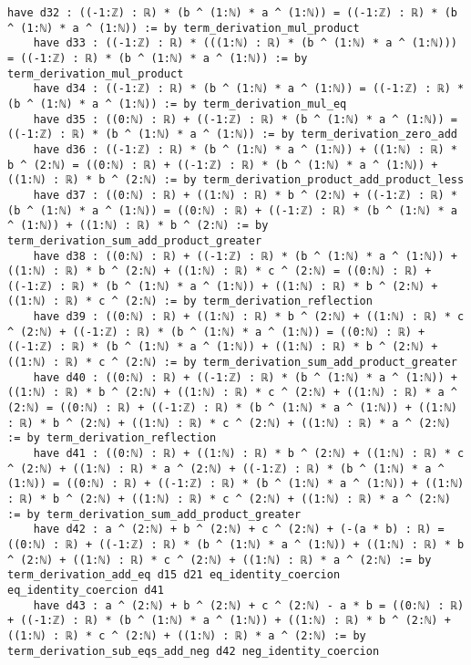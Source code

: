 \documentclass{article}
\begin{document}
\begin{tcolorbox}[colback=white!10, width=\linewidth]
\begin{lstlisting}[language=Lean4]
    have d32 : ((-1:ℤ) : ℝ) * (b ^ (1:ℕ) * a ^ (1:ℕ)) = ((-1:ℤ) : ℝ) * (b ^ (1:ℕ) * a ^ (1:ℕ)) := by term_derivation_mul_product
    have d33 : ((-1:ℤ) : ℝ) * (((1:ℕ) : ℝ) * (b ^ (1:ℕ) * a ^ (1:ℕ))) = ((-1:ℤ) : ℝ) * (b ^ (1:ℕ) * a ^ (1:ℕ)) := by term_derivation_mul_product
    have d34 : ((-1:ℤ) : ℝ) * (b ^ (1:ℕ) * a ^ (1:ℕ)) = ((-1:ℤ) : ℝ) * (b ^ (1:ℕ) * a ^ (1:ℕ)) := by term_derivation_mul_eq
    have d35 : ((0:ℕ) : ℝ) + ((-1:ℤ) : ℝ) * (b ^ (1:ℕ) * a ^ (1:ℕ)) = ((-1:ℤ) : ℝ) * (b ^ (1:ℕ) * a ^ (1:ℕ)) := by term_derivation_zero_add
    have d36 : ((-1:ℤ) : ℝ) * (b ^ (1:ℕ) * a ^ (1:ℕ)) + ((1:ℕ) : ℝ) * b ^ (2:ℕ) = ((0:ℕ) : ℝ) + ((-1:ℤ) : ℝ) * (b ^ (1:ℕ) * a ^ (1:ℕ)) + ((1:ℕ) : ℝ) * b ^ (2:ℕ) := by term_derivation_product_add_product_less
    have d37 : ((0:ℕ) : ℝ) + ((1:ℕ) : ℝ) * b ^ (2:ℕ) + ((-1:ℤ) : ℝ) * (b ^ (1:ℕ) * a ^ (1:ℕ)) = ((0:ℕ) : ℝ) + ((-1:ℤ) : ℝ) * (b ^ (1:ℕ) * a ^ (1:ℕ)) + ((1:ℕ) : ℝ) * b ^ (2:ℕ) := by term_derivation_sum_add_product_greater
    have d38 : ((0:ℕ) : ℝ) + ((-1:ℤ) : ℝ) * (b ^ (1:ℕ) * a ^ (1:ℕ)) + ((1:ℕ) : ℝ) * b ^ (2:ℕ) + ((1:ℕ) : ℝ) * c ^ (2:ℕ) = ((0:ℕ) : ℝ) + ((-1:ℤ) : ℝ) * (b ^ (1:ℕ) * a ^ (1:ℕ)) + ((1:ℕ) : ℝ) * b ^ (2:ℕ) + ((1:ℕ) : ℝ) * c ^ (2:ℕ) := by term_derivation_reflection
    have d39 : ((0:ℕ) : ℝ) + ((1:ℕ) : ℝ) * b ^ (2:ℕ) + ((1:ℕ) : ℝ) * c ^ (2:ℕ) + ((-1:ℤ) : ℝ) * (b ^ (1:ℕ) * a ^ (1:ℕ)) = ((0:ℕ) : ℝ) + ((-1:ℤ) : ℝ) * (b ^ (1:ℕ) * a ^ (1:ℕ)) + ((1:ℕ) : ℝ) * b ^ (2:ℕ) + ((1:ℕ) : ℝ) * c ^ (2:ℕ) := by term_derivation_sum_add_product_greater
    have d40 : ((0:ℕ) : ℝ) + ((-1:ℤ) : ℝ) * (b ^ (1:ℕ) * a ^ (1:ℕ)) + ((1:ℕ) : ℝ) * b ^ (2:ℕ) + ((1:ℕ) : ℝ) * c ^ (2:ℕ) + ((1:ℕ) : ℝ) * a ^ (2:ℕ) = ((0:ℕ) : ℝ) + ((-1:ℤ) : ℝ) * (b ^ (1:ℕ) * a ^ (1:ℕ)) + ((1:ℕ) : ℝ) * b ^ (2:ℕ) + ((1:ℕ) : ℝ) * c ^ (2:ℕ) + ((1:ℕ) : ℝ) * a ^ (2:ℕ) := by term_derivation_reflection
    have d41 : ((0:ℕ) : ℝ) + ((1:ℕ) : ℝ) * b ^ (2:ℕ) + ((1:ℕ) : ℝ) * c ^ (2:ℕ) + ((1:ℕ) : ℝ) * a ^ (2:ℕ) + ((-1:ℤ) : ℝ) * (b ^ (1:ℕ) * a ^ (1:ℕ)) = ((0:ℕ) : ℝ) + ((-1:ℤ) : ℝ) * (b ^ (1:ℕ) * a ^ (1:ℕ)) + ((1:ℕ) : ℝ) * b ^ (2:ℕ) + ((1:ℕ) : ℝ) * c ^ (2:ℕ) + ((1:ℕ) : ℝ) * a ^ (2:ℕ) := by term_derivation_sum_add_product_greater
    have d42 : a ^ (2:ℕ) + b ^ (2:ℕ) + c ^ (2:ℕ) + (-(a * b) : ℝ) = ((0:ℕ) : ℝ) + ((-1:ℤ) : ℝ) * (b ^ (1:ℕ) * a ^ (1:ℕ)) + ((1:ℕ) : ℝ) * b ^ (2:ℕ) + ((1:ℕ) : ℝ) * c ^ (2:ℕ) + ((1:ℕ) : ℝ) * a ^ (2:ℕ) := by term_derivation_add_eq d15 d21 eq_identity_coercion eq_identity_coercion d41
    have d43 : a ^ (2:ℕ) + b ^ (2:ℕ) + c ^ (2:ℕ) - a * b = ((0:ℕ) : ℝ) + ((-1:ℤ) : ℝ) * (b ^ (1:ℕ) * a ^ (1:ℕ)) + ((1:ℕ) : ℝ) * b ^ (2:ℕ) + ((1:ℕ) : ℝ) * c ^ (2:ℕ) + ((1:ℕ) : ℝ) * a ^ (2:ℕ) := by term_derivation_sub_eqs_add_neg d42 neg_identity_coercion

\end{lstlisting}
\end{tcolorbox}
\end{document}
